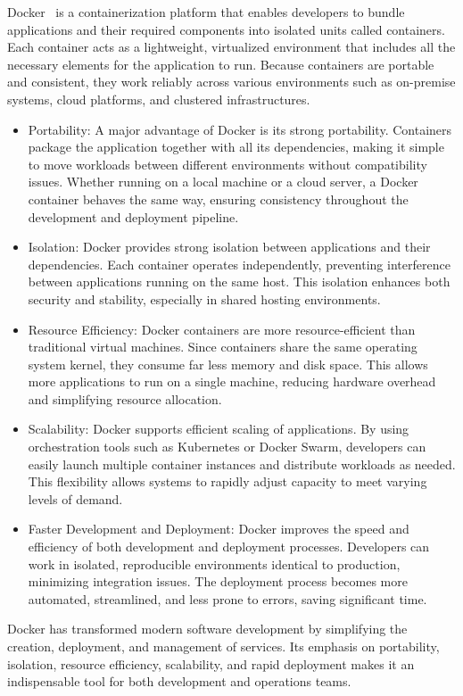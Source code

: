 Docker~\cite{docker_docs} is a containerization platform that enables developers to bundle applications and their required components into isolated units called {containers}. Each container acts as a lightweight, virtualized environment that includes all the necessary elements for the application to run. Because containers are portable and consistent, they work reliably across various environments such as on-premise systems, cloud platforms, and clustered infrastructures.
\begin{itemize}
    \item {Portability:} A major advantage of Docker is its strong portability. Containers package the application together with all its dependencies, making it simple to move workloads between different environments without compatibility issues. Whether running on a local machine or a cloud server, a Docker container behaves the same way, ensuring consistency throughout the development and deployment pipeline.

    \item {Isolation:} Docker provides strong isolation between applications and their dependencies. Each container operates independently, preventing interference between applications running on the same host. This isolation enhances both security and stability, especially in shared hosting environments.

    \item {Resource Efficiency:} Docker containers are more resource-efficient than traditional virtual machines. Since containers share the same operating system kernel, they consume far less memory and disk space. This allows more applications to run on a single machine, reducing hardware overhead and simplifying resource allocation.

    \item {Scalability:} Docker supports efficient scaling of applications. By using orchestration tools such as Kubernetes or Docker Swarm, developers can easily launch multiple container instances and distribute workloads as needed. This flexibility allows systems to rapidly adjust capacity to meet varying levels of demand.

    \item {Faster Development and Deployment:} Docker improves the speed and efficiency of both development and deployment processes. Developers can work in isolated, reproducible environments identical to production, minimizing integration issues. The deployment process becomes more automated, streamlined, and less prone to errors, saving significant time.
\end{itemize}
Docker has transformed modern software development by simplifying the creation, deployment, and management of services. Its emphasis on portability, isolation, 
resource efficiency, scalability, and rapid deployment makes it an indispensable tool for both development and operations teams.

